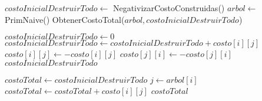\begin{algorithm}[H]
\begin{algorithmic}
	\State $costoInicialDestruirTodo \gets$ NegativizarCostoConstruidas()
	\State $arbol \gets$ PrimNaive()
	\State \Return ObtenerCostoTotal($arbol, costoInicialDestruirTodo$)
\EndFunction

\end{algorithmic}
\end{algorithm}

\begin{algorithm}[H]
\begin{algorithmic}

	\State $costoInicialDestruirTodo \gets 0$
	\For{$i \in [0..n)$}
				\State $costoInicialDestruirTodo \gets costoInicialDestruirTodo + costo[i][j]$
				\State $costo[i][j] \gets -costo[i][j]$
				\State $costo[j][i] \gets -costo[j][i]$
			\EndIf
		\EndFor
	\EndFor
	\State \Return $costoInicialDestruirTodo$
\EndFunction

\end{algorithmic}
\end{algorithm}


\begin{algorithm}[H]
\begin{algorithmic}

	\State $costoTotal \gets costoInicialDestruirTodo$
		\State $j \gets arbol[i]$
		\State $costoTotal \gets costoTotal + costo[i][j]$
	\EndFor
	\State \Return $costoTotal$
\EndFunction
\end{algorithmic}
\end{algorithm}



